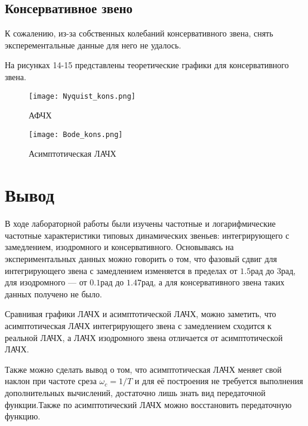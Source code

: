 \documentclass[12pt,a4paper]{article}
\begin{document}
\newpage
\begin{center}
\section{Консервативное звено}
\end{center}

К сожалению, из-за собственных колебаний консервативного звена, снять эксперементальные данные для него не удалось.

На рисунках 14-15 представлены теоретические графики для консервативного звена.

\begin{figure}[H]
	\centering
	\texttt{[image: Nyquist\_kons.png]}
	\caption{АФЧХ}
\end{figure}
\begin{figure}[H]
	\centering
	\texttt{[image: Bode\_kons.png]}
	\caption{Асимптотическая ЛАЧХ}
\end{figure}

\newpage
\section*{Вывод}
В ходе лабораторной работы были изучены частотные и логарифмические частотные характеристики типовых динамических звеньев: интегрирующего с замедлением, изодромного и консервативного.
Основываясь на экспериментальных данных можно говорить о том, что фазовый сдвиг для интегрирующего звена с замедлением изменяется в пределах от $1.5 рад$ до $3 рад$, для изодромного --- от $0.1 рад$ до $1.47 рад$, а для консервативного звена таких данных получено не было.\par
Сравнивая графики ЛАЧХ и асимптотической ЛАЧХ, можно заметить, что асимптотическая ЛАЧХ интегрирующего звена с замедлением сходится к реальной ЛАЧХ, а ЛАЧХ изодромного звена отличается от асимптотической ЛАЧХ.\par
Также можно сделать вывод о том, что асимптотическая ЛАЧХ меняет свой наклон при частоте среза $\omega_c = 1/T$ и для её построения не требуется выполнения дополнительных вычислений, достаточно лишь знать вид передаточной функции.Также по асимптотический ЛАЧХ можно восстановить передаточную функцию.  
\end{document}
